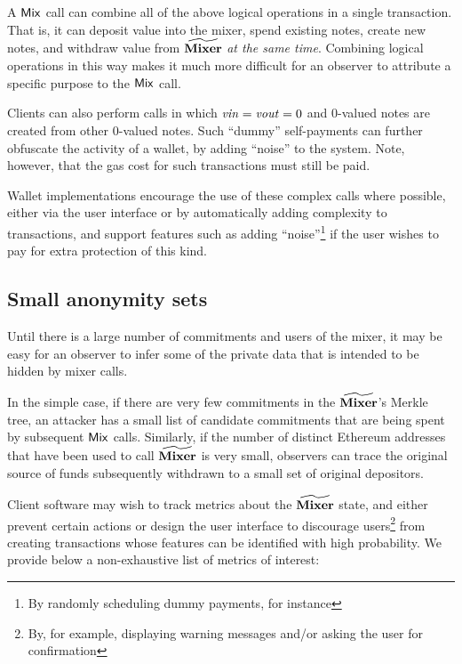 A $\mathsf{Mix}$ call can combine all of the above logical operations in a single transaction. That is, it can deposit value into the mixer, spend existing notes, create new notes, and withdraw value from $\widetilde{\mathbf{Mixer}}$ \emph{at the same time}.  Combining logical operations in this way makes it much more difficult for an observer to attribute a specific purpose to the $\mathsf{Mix}$ call.

Clients can also perform \mix{} calls in which $\mathit{vin} = \mathit{vout} = 0$ and 0-valued notes are created from other 0-valued notes. Such ``dummy'' self-payments can further obfuscate the activity of a wallet, by adding ``noise'' to the system. Note, however, that the gas cost for such transactions must still be paid.

Wallet implementations \SHOULD{} encourage the use of these complex calls where possible, either via the user interface or by automatically adding complexity to transactions, and \SHOULD{} support features such as adding ``noise''\footnote{By randomly scheduling dummy payments, for instance} if the user wishes to pay for extra protection of this kind.

\subsection{Small anonymity sets}

Until there is a large number of commitments and users of the mixer, it may be easy for an observer to infer some of the private data that is intended to be hidden by mixer calls.

In the simple case, if there are very few commitments in the $\widetilde{\mathbf{Mixer}}$'s Merkle tree, an attacker has a small list of candidate commitments that are being spent by subsequent $\mathsf{Mix}$ calls. Similarly, if the number of distinct Ethereum addresses that have been used to call $\widetilde{\mathbf{Mixer}}$ is very small, observers can trace the original source of funds subsequently withdrawn to a small set of original depositors.

Client software may wish to track metrics about the $\widetilde{\mathbf{Mixer}}$ state, and either prevent certain actions or design the user interface to discourage users\footnote{By, for example, displaying warning messages and/or asking the user for confirmation} from creating transactions whose features can be identified with high probability. We provide below a non-exhaustive list of metrics of interest:

